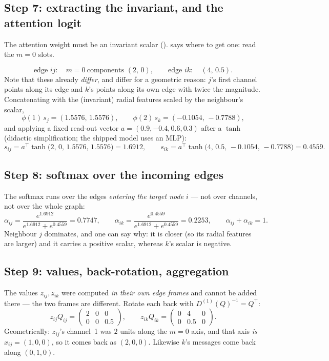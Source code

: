 \documentclass[11pt,a4paper]{report}
\theoremstyle{definition}
\theoremstyle{remark}
\begin{document}
\subsection{Step 7: extracting the invariant, and the attention logit}

The attention weight must be an invariant scalar
().  says where
to get one: read the $m=0$ slots.

\[
\text{edge }ij:\quad m{=}0\ \text{components } (2,\,0),
\qquad
\text{edge }ik:\quad (4,\,0.5) .
\]
Note that these already \emph{differ}, and differ for a geometric reason:
$j$'s first channel points along its edge and $k$'s points along its own
edge with twice the magnitude. Concatenating with the (invariant) radial
features scaled by the neighbour's scalar,
\[
\phi(1)\,s_j=(1.5576,\,1.5576),
\qquad
\phi(2)\,s_k=(-0.1054,\,-0.7788),
\]
and applying a fixed read-out vector $a=(0.9,-0.4,0.6,0.3)$ after a
$\tanh$ (didactic simplification; the shipped model uses an MLP):
\[
s_{ij}=a^\top\tanh\bigl(2,\,0,\,1.5576,\,1.5576\bigr)=\mathbf{1.6912},
\qquad
s_{ik}=a^\top\tanh\bigl(4,\,0.5,\,-0.1054,\,-0.7788\bigr)=\mathbf{0.4559} .
\]

\subsection{Step 8: softmax over the incoming edges}

The softmax runs over the edges \emph{entering the target node $i$} --- not
over channels, not over the whole graph:
\[
\alpha_{ij}=\frac{e^{1.6912}}{e^{1.6912}+e^{0.4559}}=\mathbf{0.7747},
\qquad
\alpha_{ik}=\frac{e^{0.4559}}{e^{1.6912}+e^{0.4559}}=\mathbf{0.2253},
\qquad
\alpha_{ij}+\alpha_{ik}=1 .
\]
Neighbour $j$ dominates, and one can say why: it is closer (so its radial
features are larger) and it carries a positive scalar, whereas $k$'s scalar
is negative.

\subsection{Step 9: values, back-rotation, aggregation}

The values $z_{ij},z_{ik}$ were computed \emph{in their own edge frames} and
cannot be added there --- the two frames are different. Rotate each back
with $D^{(1)}(Q)^{-1}=Q^\top$:
\[
z_{ij}Q_{ij}=\begin{pmatrix}2&0&0\\ 0&0&0.5\end{pmatrix},
\qquad
z_{ik}Q_{ik}=\begin{pmatrix}0&4&0\\ 0&0.5&0\end{pmatrix} .
\]
Geometrically: $z_{ij}$'s channel~1 was $2$ units along the $m=0$ axis, and
that axis \emph{is} $\hat x_{ij}=(1,0,0)$, so it comes back as $(2,0,0)$.
Likewise $k$'s messages come back along $(0,1,0)$.
\end{document}
